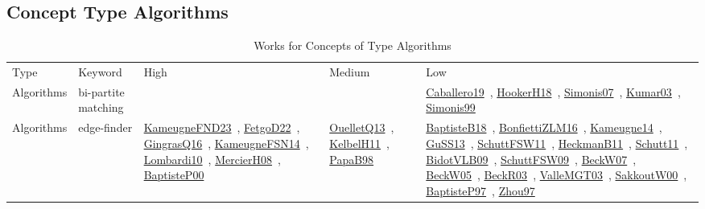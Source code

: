\clearpage
\subsection{Concept Type Algorithms}
\label{sec:Algorithms}
{\scriptsize
\begin{longtable}{lp{3cm}>{\raggedright\arraybackslash}p{6cm}>{\raggedright\arraybackslash}p{6cm}>{\raggedright\arraybackslash}p{8cm}}
\rowcolor{white}\caption{Works for Concepts of Type Algorithms}\\ \toprule
\rowcolor{white}Type & Keyword & High & Medium & Low\\ \midrule\endhead
\bottomrule
\endfoot
Algorithms & bi-partite matching &  &  & \href{works/Caballero19.pdf}{Caballero19}~\cite{Caballero19}, \href{works/HookerH18.pdf}{HookerH18}~\cite{HookerH18}, \href{works/Simonis07.pdf}{Simonis07}~\cite{Simonis07}, \href{works/Kumar03.pdf}{Kumar03}~\cite{Kumar03}, \href{works/Simonis99.pdf}{Simonis99}~\cite{Simonis99}\\
Algorithms & edge-finder & \href{works/KameugneFND23.pdf}{KameugneFND23}~\cite{KameugneFND23}, \href{works/FetgoD22.pdf}{FetgoD22}~\cite{FetgoD22}, \href{works/GingrasQ16.pdf}{GingrasQ16}~\cite{GingrasQ16}, \href{works/KameugneFSN14.pdf}{KameugneFSN14}~\cite{KameugneFSN14}, \href{works/Lombardi10.pdf}{Lombardi10}~\cite{Lombardi10}, \href{works/MercierH08.pdf}{MercierH08}~\cite{MercierH08}, \href{works/BaptisteP00.pdf}{BaptisteP00}~\cite{BaptisteP00} & \href{works/OuelletQ13.pdf}{OuelletQ13}~\cite{OuelletQ13}, \href{works/KelbelH11.pdf}{KelbelH11}~\cite{KelbelH11}, \href{works/PapaB98.pdf}{PapaB98}~\cite{PapaB98} & \href{works/BaptisteB18.pdf}{BaptisteB18}~\cite{BaptisteB18}, \href{works/BonfiettiZLM16.pdf}{BonfiettiZLM16}~\cite{BonfiettiZLM16}, \href{works/Kameugne14.pdf}{Kameugne14}~\cite{Kameugne14}, \href{works/GuSS13.pdf}{GuSS13}~\cite{GuSS13}, \href{works/SchuttFSW11.pdf}{SchuttFSW11}~\cite{SchuttFSW11}, \href{works/HeckmanB11.pdf}{HeckmanB11}~\cite{HeckmanB11}, \href{works/Schutt11.pdf}{Schutt11}~\cite{Schutt11}, \href{works/BidotVLB09.pdf}{BidotVLB09}~\cite{BidotVLB09}, \href{works/SchuttFSW09.pdf}{SchuttFSW09}~\cite{SchuttFSW09}, \href{works/BeckW07.pdf}{BeckW07}~\cite{BeckW07}, \href{works/BeckW05.pdf}{BeckW05}~\cite{BeckW05}, \href{works/BeckR03.pdf}{BeckR03}~\cite{BeckR03}, \href{works/ValleMGT03.pdf}{ValleMGT03}~\cite{ValleMGT03}, \href{works/SakkoutW00.pdf}{SakkoutW00}~\cite{SakkoutW00}, \href{works/BaptisteP97.pdf}{BaptisteP97}~\cite{BaptisteP97}, \href{works/Zhou97.pdf}{Zhou97}~\cite{Zhou97}\\

\end{longtable}}
